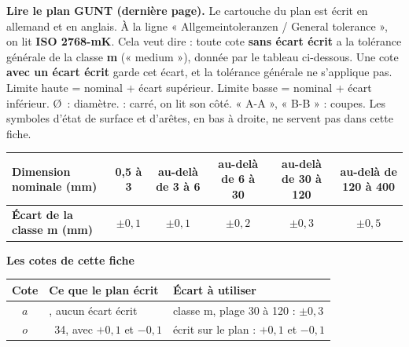 \documentclass[10pt,a4paper]{article}
\begin{document}
\providecommand{\carre}{\fbox{\rule{0pt}{1.1ex}\rule{1.1ex}{0pt}}}
\begin{tcolorbox}[boite,left=5pt,right=5pt,top=3pt,bottom=3pt]\footnotesize
\textbf{\color{uimm}Lire le plan GUNT (dernière page).} Le cartouche du plan est écrit en allemand et en anglais. À la ligne « Allgemeintoleranzen / General tolerance », on lit \textbf{ISO 2768-mK}. Cela veut dire : toute cote \textbf{sans écart écrit} a la tolérance générale de la classe \textbf{m} (« medium »), donnée par le tableau ci-dessous. Une cote \textbf{avec un écart écrit} garde cet écart, et la tolérance générale ne s'applique pas. Limite haute = nominal + écart supérieur. Limite basse = nominal + écart inférieur. \O\ : diamètre. \carre{} : carré, on lit son côté. « A-A », « B-B » : coupes. Les symboles d'état de surface et d'arêtes, en bas à droite, ne servent pas dans cette fiche.
\par\vspace{6pt}\noindent\renewcommand{\arraystretch}{1.2}\setlength{\tabcolsep}{4pt}
\begin{tabular}{|l|c|c|c|c|c|}\hline
\textbf{Dimension nominale (mm)} & 0,5 à 3 & au-delà de 3 à 6 & au-delà de 6 à 30 & au-delà de 30 à 120 & au-delà de 120 à 400\\\hline
\textbf{Écart de la classe m (mm)} & $\pm 0{,}1$ & $\pm 0{,}1$ & $\pm 0{,}2$ & $\pm 0{,}3$ & $\pm 0{,}5$\\\hline
\end{tabular}
\par\vspace{1pt}{\scriptsize Source : ISO 2768-1:1989, tolérances générales des dimensions linéaires, reprises dans la fiche GUNT « PT105f Tolérances ».}
\par\vspace{4pt}\textbf{Les cotes de cette fiche}\par\vspace{2pt}
\begin{tabularx}{\linewidth}{|c|>{\raggedright\arraybackslash}X|>{\raggedright\arraybackslash}X|}\hline
\textbf{Cote} & \textbf{Ce que le plan écrit} & \textbf{Écart à utiliser}\\\hline
$a$ & 105, aucun écart écrit & classe m, plage 30 à 120 : $\pm 0{,}3$ \\\hline
$o$ & \hspace{2pt}\carre{}\ 34, avec $+0{,}1$ et $-0{,}1$ & écrit sur le plan : $+0{,}1$ et $-0{,}1$ \\\hline
\end{tabularx}
\end{tcolorbox}
\end{document}
